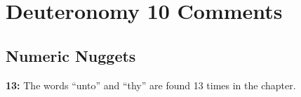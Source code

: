 \section{Deuteronomy 10 Comments}

\subsection{Numeric Nuggets}
\textbf{13: } The words ``unto'' and ``thy'' are found 13 times in the chapter.